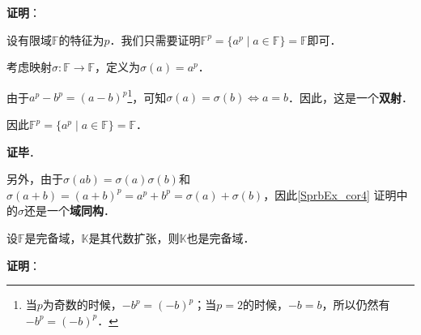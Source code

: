 \textbf{证明}：

设有限域$\mathbb{F}$的特征为$p$．我们只需要证明$\mathbb{F}^p=\{a^p\mid a\in\mathbb{F}\}=\mathbb{F}$即可．

考虑映射$\sigma:\mathbb{F}\to\mathbb{F}$，定义为$\sigma(a)=a^p$．

由于$a^p-b^p=(a-b)^p$\footnote{当$p$为奇数的时候，$-b^p=(-b)^p$；当$p=2$的时候，$-b=b$，所以仍然有$-b^p=(-b)^p$．}，可知$\sigma(a)=\sigma(b)\iff a=b$．因此，这是一个\textbf{双射}．

因此$\mathbb{F}^p=\{a^p\mid a\in\mathbb{F}\}=\mathbb{F}$．

\textbf{证毕}．

另外，由于$\sigma(ab)=\sigma(a)\sigma(b)$和$\sigma(a+b)=(a+b)^p=a^p+b^p=\sigma(a)+\sigma(b)$，因此\autoref{SprbEx_cor4} 证明中的$\sigma$还是一个\textbf{域同构}．


\begin{corollary}{}\label{SprbEx_cor5}
设$\mathbb{F}$是完备域，$\mathbb{K}$是其代数扩张，则$\mathbb{K}$也是完备域．
\end{corollary}


\textbf{证明}：











